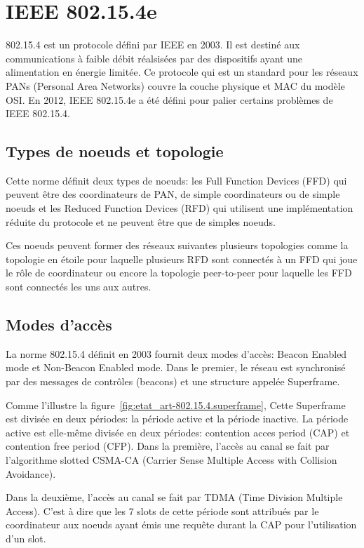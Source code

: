 \section{IEEE 802.15.4e}\label{sec:etat_art-802.15.4}
\renewcommand{\rightmark}{IEEE 802.15.4e}
    802.15.4 est un protocole défini par IEEE en 2003. Il est destiné aux communications à faible débit réalsisées par des dispositifs ayant une alimentation en énergie limitée.
    Ce protocole qui est un standard pour les réseaux PANs (Personal Area Networks) couvre la couche physique et MAC du modèle OSI. En 2012, IEEE 802.15.4e a été défini pour palier certains problèmes de IEEE 802.15.4.

  \subsection*{Types de noeuds et topologie}
    Cette norme définit deux types de noeuds: les Full Function Devices (FFD) qui peuvent être des coordinateurs de PAN, de simple coordinateurs ou de simple noeuds et les Reduced Function Devices (RFD) qui utilisent une implémentation réduite du protocole et ne peuvent être que de simples noeuds.

    Ces noeuds peuvent former des réseaux suivantes plusieurs topologies
    comme la topologie en étoile pour laquelle plusieurs RFD sont connectés à un FFD qui
    joue le rôle de coordinateur ou encore la topologie peer-to-peer pour laquelle les FFD sont connectés les uns aux autres.

  \subsection*{Modes d'accès}
    La norme 802.15.4 définit en 2003 fournit deux modes d'accès: Beacon Enabled mode et Non-Beacon Enabled mode.
    Dans le premier, le réseau est synchronisé par des messages de contrôles (beacons)
    et une structure appelée Superframe.

    Comme l'illustre la figure~\ref{fig:etat_art-802.15.4.superframe}, Cette Superframe est divisée en deux périodes: la période active et la période inactive. La période active est elle-même divisée en deux périodes: contention acces period (CAP) et contention free period (CFP). Dans la première, l'accès au canal se fait par l'algorithme slotted CSMA-CA (Carrier Sense Multiple Access with Collision Avoidance).
    
    Dans la deuxième, l'accès au canal se fait par TDMA (Time Division Multiple Access). C'est à dire que les 7 slots de cette période sont attribués par le coordinateur aux noeuds ayant émis une requête durant la CAP pour l'utilisation d'un slot.

